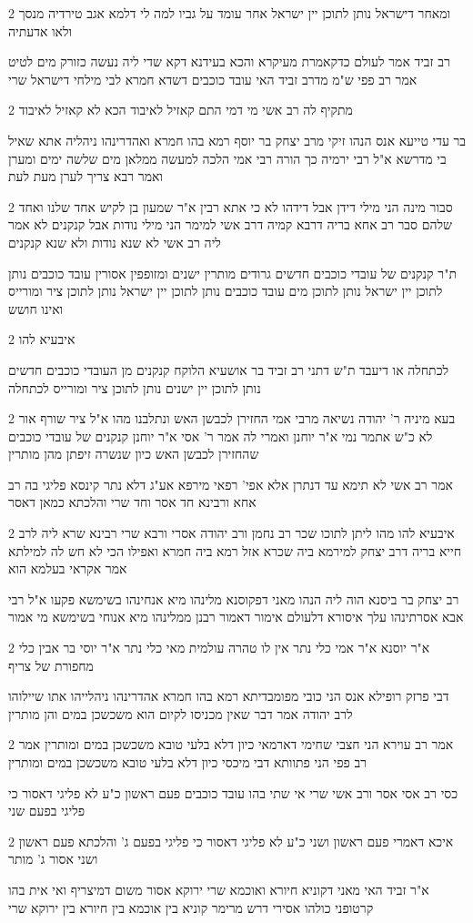 \documentclass[12pt, openany]{book}
\newcommand{\sethebfont}{
\fontsize{10.5pt}{21.0pt} \selectfont
}
\newcommand{\twocol}[1]{
	{\sethebfont \begin{multicols}{2}
			#1
	\end{multicols}}	
}
\begin{document}
\twocol{ומאחר דישראל נותן לתוכן יין ישראל אחר עומד על גביו למה לי דלמא אגב טירדיה מנסך ולאו אדעתיה
\par רב זביד אמר לעולם כדקאמרת מעיקרא והכא בעידנא דקא שדי ליה נעשה כזורק מים לטיט אמר רב פפי ש"מ מדרב זביד האי עובד כוכבים דשדא חמרא לבי מילחי דישראל שרי}
\twocol{מתקיף לה רב אשי מי דמי התם קאזיל לאיבוד הכא לא קאזיל לאיבוד
\par בר עדי טייעא אנס הנהו זיקי מרב יצחק בר יוסף רמא בהו חמרא ואהדרינהו ניהליה אתא שאיל בי מדרשא א"ל רבי ירמיה כך הורה רבי אמי הלכה למעשה ממלאן מים שלשה ימים ומערן ואמר רבא צריך לערן מעת לעת}
\twocol{סבור מינה הני מילי דידן אבל דידהו לא כי אתא רבין א"ר שמעון בן לקיש אחד שלנו ואחד שלהם סבר רב אחא בריה דרבא קמיה דרב אשי למימר הני מילי נודות אבל קנקנים לא אמר ליה רב אשי לא שנא נודות ולא שנא קנקנים
\par ת"ר קנקנים של עובדי כוכבים חדשים גרודים מותרין ישנים ומזופפין אסורין עובד כוכבים נותן לתוכן יין ישראל נותן לתוכן מים עובד כוכבים נותן לתוכן יין ישראל נותן לתוכן ציר ומורייס ואינו חושש}
\twocol{איבעיא להו
\par לכתחלה או דיעבד ת"ש דתני רב זביד בר אושעיא הלוקח קנקנים מן העובדי כוכבים חדשים נותן לתוכן יין ישנים נותן לתוכן ציר ומורייס לכתחלה}
\twocol{בעא מיניה ר' יהודה נשיאה מרבי אמי החזירן לכבשן האש ונתלבנו מהו א"ל ציר שורף אור לא כ"ש אתמר נמי א"ר יוחנן ואמרי לה אמר ר' אסי א"ר יוחנן קנקנים של עובדי כוכבים שהחזירן לכבשן האש כיון שנשרה זיפתן מהן מותרין
\par אמר רב אשי לא תימא עד דנתרן אלא אפי' רפאי מירפא אע"ג דלא נתר קינסא פליגי בה רב אחא ורבינא חד אסר וחד שרי והלכתא כמאן דאסר}
\twocol{איבעיא להו מהו ליתן לתוכו שכר רב נחמן ורב יהודה אסרי ורבא שרי רבינא שרא ליה לרב חייא בריה דרב יצחק למירמא ביה שכרא אזל רמא ביה חמרא ואפילו הכי לא חש לה למילתא אמר אקראי בעלמא הוא
\par רב יצחק בר ביסנא הוה ליה הנהו מאני דפקוסנא מלינהו מיא אנחינהו בשימשא פקעו א"ל רבי אבא אסרתינהו עלך איסורא דלעולם אימור דאמור רבנן ממלינהו מיא אנוחי בשימשא מי אמור}
\twocol{א"ר יוסנא א"ר אמי כלי נתר אין לו טהרה עולמית מאי כלי נתר א"ר יוסי בר אבין כלי מחפורת של צריף
\par דבי פרזק רופילא אנס הני כובי מפומבדיתא רמא בהו חמרא אהדרינהו ניהלייהו אתו שיילוהו לרב יהודה אמר דבר שאין מכניסו לקיום הוא משכשכן במים והן מותרין}
\twocol{אמר רב עוירא הני חצבי שחימי דארמאי כיון דלא בלעי טובא משכשכן במים ומותרין אמר רב פפי הני פתוותא דבי מיכסי כיון דלא בלעי טובא משכשכן במים ומותרין
\par כסי רב אסי אסר ורב אשי שרי אי שתי בהו עובד כוכבים פעם ראשון כ"ע לא פליגי דאסור כי פליגי בפעם שני}
\twocol{איכא דאמרי פעם ראשון ושני כ"ע לא פליגי דאסור כי פליגי בפעם ג' והלכתא פעם ראשון ושני אסור ג' מותר
\par א"ר זביד האי מאני דקוניא חיורא ואוכמא שרי ירוקא אסור משום דמיצריף ואי אית בהו קרטופני כולהו אסירי דרש מרימר קוניא בין אוכמא בין חיורא בין ירוקא שרי}
\end{document}
